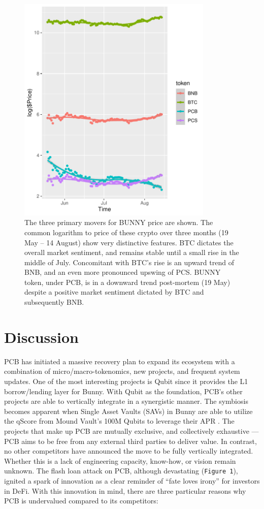 \documentclass[12pt]{article}
\begin{document}
\begin{figure}[ht]
\centering
\includegraphics[height=11cm]{pcb_plot.pdf}
\caption{The three primary movers for BUNNY price are shown. The common logarithm to price of these crypto over three months (19 May – 14 August) show very distinctive features. BTC dictates the overall market sentiment, and remains stable until a small rise in the middle of July. Concomitant with BTC’s rise is an upward trend of BNB, and an even more pronounced upswing of PCS. BUNNY token, under PCB, is in a downward trend post-mortem (19 May) despite a positive market sentiment dictated by BTC and subsequently BNB. }
\end{figure}


\section*{Discussion}
PCB has initiated a massive recovery plan to expand its ecosystem with a combination of micro/macro-tokenomics, new projects, and frequent system updates. One of the most interesting projects is Qubit since it provides the L1 borrow/lending layer for Bunny. With Qubit as the foundation, PCB’s other projects are able to vertically integrate in a synergistic manner. The symbiosis becomes apparent when Single Asset Vaults (SAVs) in Bunny are able to utilize the qScore from Mound Vault’s 100M Qubits to leverage their APR \cite{bunny_qbt}. The projects that make up PCB are mutually exclusive, and collectively exhaustive — PCB aims to be free from any external third parties to deliver value. In contrast, no other competitors have announced the move to be fully vertically integrated. Whether this is a lack of engineering capacity, know-how, or vision remain unknown. The flash loan attack on PCB, although devastating (\verb|Figure 1|), ignited a spark of innovation as a clear reminder of “fate loves irony” for investors in DeFi. With this innovation in mind, there are three particular reasons why PCB is undervalued compared to its competitors:
\end{document}
